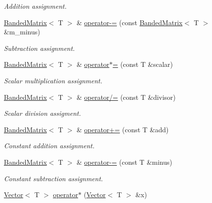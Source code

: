 \begin{DoxyCompactItemize}
\begin{DoxyCompactList}\small\item\em Addition assignment. \end{DoxyCompactList}\item 
\hyperlink{classLuna_1_1BandedMatrix}{Banded\+Matrix}$<$ T $>$ \& \hyperlink{classLuna_1_1BandedMatrix_a4a38366bcdc1401fff6f70add2f01ae1}{operator-\/=} (const \hyperlink{classLuna_1_1BandedMatrix}{Banded\+Matrix}$<$ T $>$ \&m\+\_\+minus)
\begin{DoxyCompactList}\small\item\em Subtraction assignment. \end{DoxyCompactList}\item 
\hyperlink{classLuna_1_1BandedMatrix}{Banded\+Matrix}$<$ T $>$ \& \hyperlink{classLuna_1_1BandedMatrix_aa6f7d004e260feb4dc20ed09692598f1}{operator$\ast$=} (const T \&scalar)
\begin{DoxyCompactList}\small\item\em Scalar multiplication assignment. \end{DoxyCompactList}\item 
\hyperlink{classLuna_1_1BandedMatrix}{Banded\+Matrix}$<$ T $>$ \& \hyperlink{classLuna_1_1BandedMatrix_ace564482ba04dbf55a0237c4d1092dce}{operator/=} (const T \&divisor)
\begin{DoxyCompactList}\small\item\em Scalar division assigment. \end{DoxyCompactList}\item 
\hyperlink{classLuna_1_1BandedMatrix}{Banded\+Matrix}$<$ T $>$ \& \hyperlink{classLuna_1_1BandedMatrix_a37348fae7fd2ad220be2dad6a232c764}{operator+=} (const T \&add)
\begin{DoxyCompactList}\small\item\em Constant addition assignment. \end{DoxyCompactList}\item 
\hyperlink{classLuna_1_1BandedMatrix}{Banded\+Matrix}$<$ T $>$ \& \hyperlink{classLuna_1_1BandedMatrix_aeb5d53779b22b9a4e378f0a2af96ef77}{operator-\/=} (const T \&minus)
\begin{DoxyCompactList}\small\item\em Constant subtraction assignment. \end{DoxyCompactList}\item 
\hyperlink{classLuna_1_1Vector}{Vector}$<$ T $>$ \hyperlink{classLuna_1_1BandedMatrix_ab41cb941c8a4e2b0d6c49fa0bd57637d}{operator$\ast$} (\hyperlink{classLuna_1_1Vector}{Vector}$<$ T $>$ \&x)

\end{DoxyCompactItemize}
